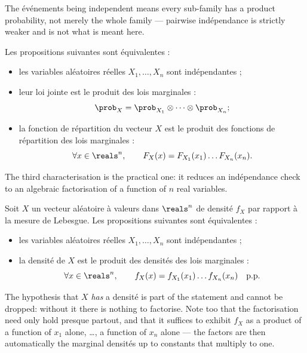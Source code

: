 The événements being independent means every sub-family has a product
probability, not merely the whole family --- pairwise indépendance is strictly
weaker and is not what is meant here.

\begin{theorem}
  Les propositions suivantes sont équivalentes :
  \begin{itemize}
    \item les variables aléatoires réelles $X_{1},\dots,X_{n}$ sont
      indépendantes ;
    \item leur loi jointe est le produit des lois marginales :
      \[
        \prob_{X} = \prob_{X_{1}} \otimes \dots \otimes \prob_{X_{n}} ;
      \]
    \item la fonction de répartition du vecteur $X$ est le produit des fonctions
      de répartition des lois marginales :
      \[
        \forall x \in \reals^{n}, \qquad
        F_{X}(x) = F_{X_{1}}(x_{1}) \dots F_{X_{n}}(x_{n}).
      \]
  \end{itemize}
\end{theorem}

The third characterisation is the practical one: it reduces an indépendance check
to an algebraic factorisation of a function of $n$ real variables.

\begin{theorem}
  Soit $X$ un vecteur aléatoire à valeurs dans $\reals^{n}$ de densité $f_{X}$
  par rapport à la mesure de Lebesgue. Les propositions suivantes sont
  équivalentes :
  \begin{itemize}
    \item les variables aléatoires réelles $X_{1},\dots,X_{n}$ sont
      indépendantes ;
    \item la densité de $X$ est le produit des densités des lois marginales :
      \[
        \forall x \in \reals^{n}, \qquad
        f_{X}(x) = f_{X_{1}}(x_{1}) \dots f_{X_{n}}(x_{n}) \quad \text{p.p.}
      \]
  \end{itemize}
\end{theorem}

The hypothesis that $X$ \emph{has} a densité is part of the statement and cannot
be dropped: without it there is nothing to factorise. Note too that the
factorisation need only hold presque partout, and that it suffices to exhibit
$f_{X}$ as a product of a function of $x_{1}$ alone, \ldots, a function of
$x_{n}$ alone --- the factors are then automatically the marginal densités up to
constants that multiply to one.

